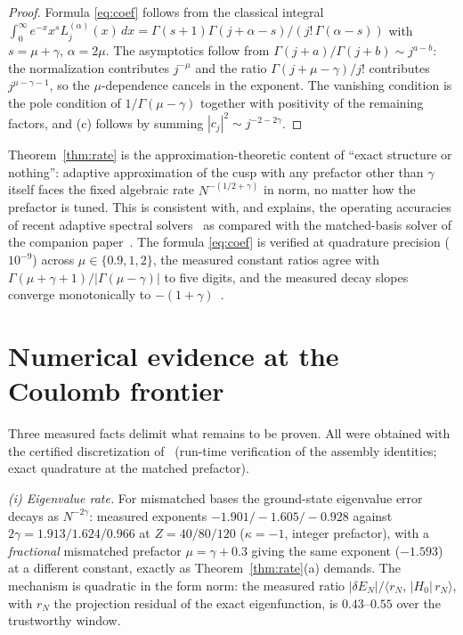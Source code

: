 \documentclass[11pt,reqno]{amsart}
\theoremstyle{definition}
\theoremstyle{remark}
\newcommand{\ip}[2]{\langle #1,\,#2\rangle}
\begin{document}
\begin{proof}
Formula \eqref{eq:coef} follows from the classical integral
$\int_{0}^{\infty}e^{-x}x^{s}L_{j}^{(\alpha)}(x)\,dx=
\Gamma(s+1)\Gamma(j+\alpha-s)/(j!\,\Gamma(\alpha-s))$ with
$s=\mu+\gamma$, $\alpha=2\mu$. The asymptotics follow from
$\Gamma(j+a)/\Gamma(j+b)\sim j^{a-b}$: the normalization contributes
$j^{-\mu}$ and the ratio $\Gamma(j+\mu-\gamma)/j!$ contributes
$j^{\mu-\gamma-1}$, so the $\mu$-dependence cancels in the exponent.
The vanishing condition is the pole condition of
$1/\Gamma(\mu-\gamma)$ together with positivity of the remaining
factors, and (c) follows by summing $|c_{j}|^{2}\sim j^{-2-2\gamma}$.
\end{proof}

Theorem~\ref{thm:rate} is the approximation-theoretic content of
``exact structure or nothing'': adaptive approximation of the cusp with
any prefactor other than $\gamma$ itself faces the fixed algebraic rate
$N^{-(1/2+\gamma)}$ in norm, no matter how the prefactor is tuned. This
is consistent with, and explains, the operating accuracies of recent
adaptive spectral solvers~\cite{ChenShaoWu2026} as compared with the
matched-basis solver of the companion paper~\cite{companion}. The
formula \eqref{eq:coef} is verified at quadrature precision
($10^{-9}$) across $\mu\in\{0.9,1,2\}$, the measured constant ratios
agree with $\Gamma(\mu+\gamma+1)/|\Gamma(\mu-\gamma)|$ to five digits,
and the measured decay slopes converge monotonically to
$-(1+\gamma)$~\cite{companion}.

\section{Numerical evidence at the Coulomb frontier}
\label{sec:frontier}

Three measured facts delimit what remains to be proven. All were
obtained with the certified discretization of~\cite{companion}
(run-time verification of the assembly identities; exact quadrature at
the matched prefactor).

\emph{(i) Eigenvalue rate.} For mismatched bases the ground-state
eigenvalue error decays as $N^{-2\gamma}$: measured exponents
$-1.901/-1.605/-0.928$ against $2\gamma=1.913/1.624/0.966$ at
$Z=40/80/120$ ($\kappa=-1$, integer prefactor), with a
\emph{fractional} mismatched prefactor $\mu=\gamma+0.3$ giving the same
exponent ($-1.593$) at a different constant, exactly as
Theorem~\ref{thm:rate}(a) demands. The mechanism is quadratic in the
form norm: the measured ratio
$|\delta E_{N}|/\ip{r_{N}}{|H_{0}|\,r_{N}}$, with $r_{N}$ the
projection residual of the exact eigenfunction, is $0.43$--$0.55$ over
the trustworthy window.
\end{document}
